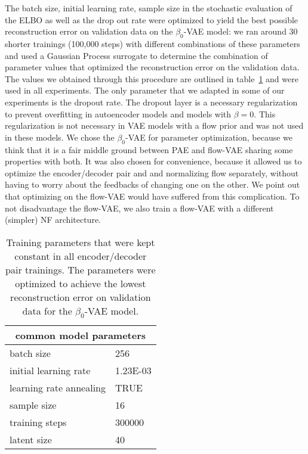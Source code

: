 \documentclass[10pt]{article} \usepackage[accepted]{tmlr}
\begin{document}
The batch size, initial learning rate, sample size in the stochastic evaluation of the ELBO as well as the drop out rate were optimized to yield the best possible reconstruction error on validation data on the $\beta_0$-VAE model: we ran around 30 shorter trainings (100,000 steps) with different combinations of these parameters and used a Gaussian Process surrogate to determine the combination of parameter values that optimized the reconstruction error on the validation data. The values we obtained through this procedure are outlined in table~\ref{tab:com_params} and were used in all experiments. The only parameter that we adapted in some of our experiments is the dropout rate. The dropout layer is a necessary regularization to prevent overfitting in autoencoder models and models with $\beta=0$. This regularization is not necessary in VAE models with a flow prior and was not used in these models. We chose the $\beta_0$-VAE for parameter optimization, because we think that it is a fair middle ground between PAE and flow-VAE sharing some properties with both. It was also chosen for convenience, because it allowed us to optimize the encoder/decoder pair and and normalizing flow separately, without having to worry about the feedbacks of changing one on the other. We point out that optimizing on the flow-VAE would have suffered from this complication. To not disadvantage the flow-VAE, we also train a flow-VAE with a different (simpler) NF architecture. \begin{table}[h]
\begin{center}
\begin{tabular}{ll}
\multicolumn{2}{c}{\textbf{common model parameters}} \\ \hline
batch size                       & 256               \\
initial learning rate            & 1.23E-03          \\
learning rate annealing          & TRUE              \\
sample size                      & 16                \\
training steps                   & 300000            \\
latent size                      & 40               
\end{tabular}
\end{center}
\caption{\label{tab:com_params} Training parameters that were kept constant in all encoder/decoder pair trainings. The parameters were optimized to achieve the lowest reconstruction error on validation data for the $\beta_0$-VAE model.}
\end{table}
\end{document}

